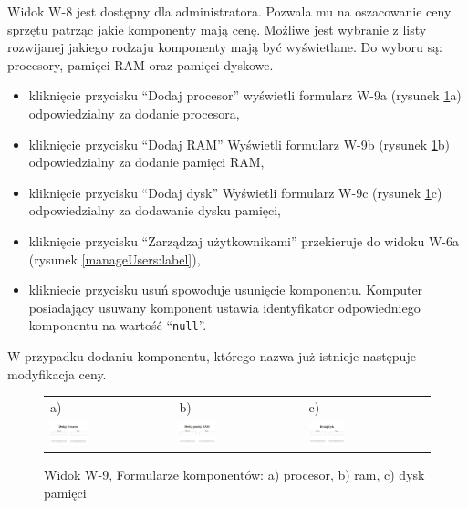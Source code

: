 Widok W-8 jest dostępny dla administratora. Pozwala mu na oszacowanie ceny sprzętu patrząc jakie komponenty mają cenę. Możliwe jest wybranie z listy rozwijanej jakiego rodzaju komponenty mają być wyświetlane. Do wyboru są: procesory, pamięci RAM oraz pamięci dyskowe.
\begin{itemize}
	\item kliknięcie przycisku "`Dodaj procesor"' wyświetli formularz W-9a (rysunek \ref{compforms:label}a) odpowiedzialny za dodanie procesora,
	\item kliknięcie przycisku "`Dodaj RAM"' Wyświetli formularz W-9b (rysunek \ref{compforms:label}b) odpowiedzialny za dodanie pamięci RAM,
	\item kliknięcie przycisku "`Dodaj dysk"' Wyświetli formularz W-9c (rysunek \ref{compforms:label}c) odpowiedzialny za dodawanie dysku pamięci,
	\item kliknięcie przycisku "`Zarządzaj użytkownikami"' przekieruje do widoku W-6a (rysunek \ref{manageUsers:label}),
	\item klikniecie przycisku usuń spowoduje usunięcie komponentu. Komputer posiadający usuwany komponent ustawia identyfikator odpowiedniego komponentu na wartość "`\texttt{null}"'.
\end{itemize} 

W przypadku dodaniu komponentu, którego nazwa już istnieje następuje modyfikacja ceny.

\begin{figure}[H]
  \centering
	\begin{tabular}{@{}lll@{}}
	a) & b) & c) \\
  \includegraphics[width=0.31\textwidth]{rys05/view/addProc.pdf} & 
	\includegraphics[width=0.31\textwidth]{rys05/view/addRam.pdf} &
	\includegraphics[width=0.31\textwidth]{rys05/view/addStorage.pdf}
	\end{tabular}
  \caption{Widok W-9, Formularze komponentów: a) procesor, b) ram, c) dysk pamięci}
  \label{compforms:label}
\end{figure}

